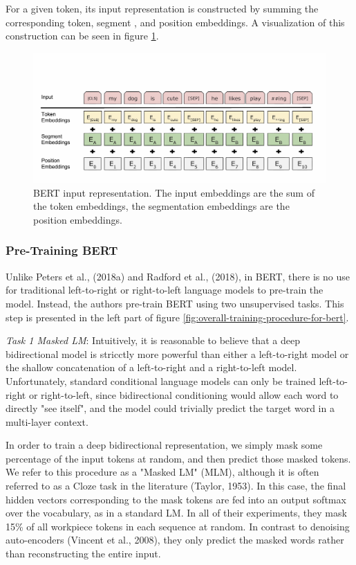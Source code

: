 \documentclass{report}
\begin{document}
For a given token, its input representation is constructed by summing the corresponding token, segment , and position embeddings. A visualization of this construction can be seen in figure \ref{fig:bert-input-representation}.

\begin{figure}
	\includegraphics{images/bert/input-representation.jpg}
	\caption{BERT input representation. The input embeddings are the sum of the token embeddings, the segmentation embeddings are the position embeddings.}
	\label{fig:bert-input-representation}
\end{figure}

\subsubsection{Pre-Training BERT}
\label{sssec:pre-training-bert}
Unlike Peters et al., (2018a) and Radford et al., (2018), in BERT, there is no use for traditional left-to-right or right-to-left language models to pre-train the model. Instead, the authors pre-train BERT using two unsupervised tasks. This step is presented in the left part of figure \ref{fig:overall-training-procedure-for-bert}.

\textit{Task 1 Masked LM}:
Intuitively, it is reasonable to believe that a deep bidirectional model is stricctly more powerful than either a left-to-right model or the shallow concatenation of a left-to-right and a right-to-left model. Unfortunately, standard conditional language models can only be trained left-to-right or right-to-left, since bidirectional conditioning would allow each word to directly "see itself", and the model could trivially predict the target word in a multi-layer context.

In order to train a deep bidirectional representation, we simply mask some percentage of the input tokens at random, and then predict those masked tokens. We refer to this procedure as a "Masked LM" (MLM), although it is often referred to as a Cloze task in the literature (Taylor, 1953). In this case, the final hidden vectors corresponding to the mask tokens are fed into an output softmax over the vocabulary, as in a standard LM. In all of their experiments, they mask 15\% of all workpiece tokens in each sequence at random. In contrast to denoising auto-encoders (Vincent et al., 2008), they only predict the masked words rather than reconstructing the entire input.
\end{document}
